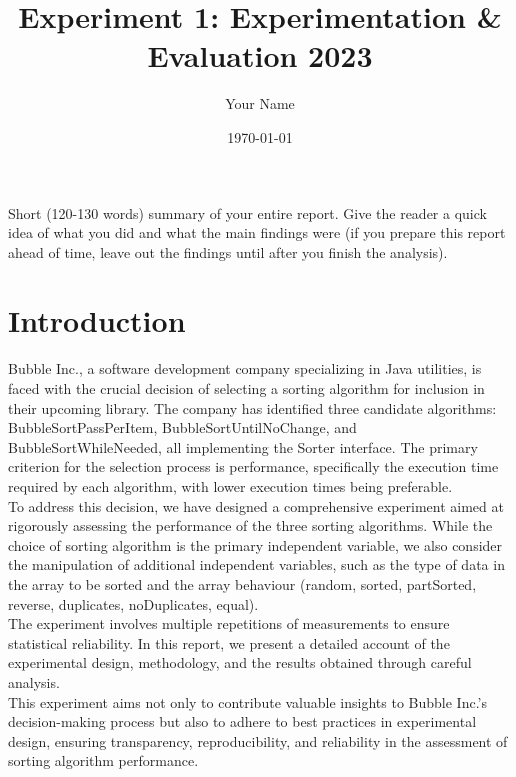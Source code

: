 \documentclass{article}
\title{Experiment 1: Experimentation \& Evaluation 2023}
\author{Your Name}
\date{\today}
\begin{document}
\maketitle

Short (120-130 words) summary of your entire report. Give the reader a quick idea of what you did and what the main findings were (if you prepare this report ahead of time, leave out the findings until after you finish the analysis).


\section{Introduction}
Bubble Inc., a software development company specializing in Java utilities, is faced with the crucial decision of selecting a sorting algorithm for inclusion in their upcoming library. The company has identified three candidate algorithms: BubbleSortPassPerItem, BubbleSortUntilNoChange, and BubbleSortWhileNeeded, all implementing the Sorter interface. The primary criterion for the selection process is performance, specifically the execution time required by each algorithm, with lower execution times being preferable.\\
To address this decision, we have designed a comprehensive experiment aimed at rigorously assessing the performance of the three sorting algorithms. While the choice of sorting algorithm is the primary independent variable, we also consider the manipulation of additional independent variables, such as the type of data in the array to be sorted and the array behaviour (random, sorted, partSorted, reverse, duplicates, noDuplicates, equal).\\
The experiment involves multiple repetitions of measurements to ensure statistical reliability. In this report, we present a detailed account of the experimental design, methodology, and the results obtained through careful analysis.\\
This experiment aims not only to contribute valuable insights to Bubble Inc.'s decision-making process but also to adhere to best practices in experimental design, ensuring transparency, reproducibility, and reliability in the assessment of sorting algorithm performance.
\end{document}
